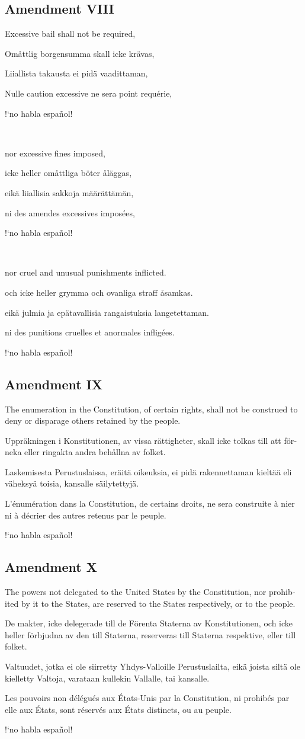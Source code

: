 \documentclass[a4paper,landscape,10pt]{article}
\newcommand{\tblock}[5]{\noindent\begin{minipage}[t]{0.18\textwidth}\foreignlanguage{english}{#1}\end{minipage}\hskip 0.025\textwidth\begin{minipage}[t]{0.18\textwidth}\foreignlanguage{swedish}{#2}\end{minipage}\hskip 0.025\textwidth\begin{minipage}[t]{0.18\textwidth}\foreignlanguage{finnish}{#3}\end{minipage}\hskip 0.025\textwidth\begin{minipage}[t]{0.18\textwidth}\foreignlanguage{french}{#4}\end{minipage}\hskip 0.025\textwidth\begin{minipage}[t]{0.18\textwidth}\foreignlanguage{spanish}{#5}\end{minipage}}
\begin{document}
\subsection*{Amendment VIII}
\tblock
{Excessive bail shall not be required,}
{Omåttlig borgensumma skall icke krävas,}
{Liiallista takausta ei pidä vaadittaman,}
{Nulle caution excessive ne sera point requérie,}
{!`no habla español!}

~

\tblock
{nor excessive fines imposed,}
{icke heller omåttliga böter åläggas,}
{eikä liiallisia sakkoja määrättämän,}
{ni des amendes excessives imposées,}
{!`no habla español!}

~

\tblock
{nor cruel and unusual punishments inflicted.}
{och icke heller grymma och ovanliga straff åsamkas.}
{eikä julmia ja epätavallisia rangaistuksia langetettaman.}
{ni des punitions cruelles et anormales infligées.}
{!`no habla español!}

\subsection*{Amendment IX}
\tblock
{The enumeration in the Constitution, of certain rights, shall not be construed to deny or disparage others retained by the people.}
{Uppräkningen i Konstitutionen, av vissa rättigheter, skall icke tolkas till att förneka eller ringakta andra behållna av folket.}
{Laskemisesta Perustuslaissa, eräitä oikeuksia, ei pidä rakennettaman kieltää eli väheksyä toisia, kansalle säilytettyjä.}
{L'énumération dans la Constitution, de certains droits, ne sera construite à nier ni à décrier des autres retenus par le peuple.}
{!`no habla español!}

\subsection*{Amendment X}
\tblock
{The powers not delegated to the United States by the Constitution, nor prohibited by it to the States, are reserved to the States respectively, or to the people.}
{De makter, icke delegerade till de Förenta Staterna av Konstitutionen, och icke heller förbjudna av den till Staterna, reserveras till Staterna respektive, eller till folket.}
{Valtuudet, jotka ei ole siirretty Yhdys-Valloille Perustuslailta, eikä joista siltä ole kielletty Valtoja, varataan kullekin Vallalle, tai kansalle.}
{Les pouvoirs non délégués aux États-Unis par la Constitution, ni prohibés par elle aux États, sont réservés aux États distincts, ou au peuple.}
{!`no habla español!}
\end{document}

